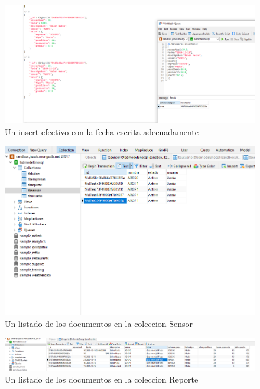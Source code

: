\documentclass[twoside,twocolumn]{article}
\begin{document}
\begin{itemize}
\begin{figure}[h!]
\centering
\includegraphics[scale=0.20]{Image/insertOneReporteEfectivoConBuenaFecha.PNG}
\caption{Un insert efectivo con la fecha escrita adecuadamente}
\label{fig:Csha3}
\end{figure}

\begin{figure}[h!]
\centering
\includegraphics[scale=0.30]{Image/Listado de Sensore.PNG}
\caption{Un listado de los documentos en la coleccion Sensor}
\label{fig:Csha3}
\end{figure}

\begin{figure}[h!]
\centering
\includegraphics[scale=0.15]{Image/ListReporte.PNG}
\caption{Un listado de los documentos en la coleccion Reporte}
\label{fig:Csha3}
\end{figure}


\end{itemize}
\end{document}
